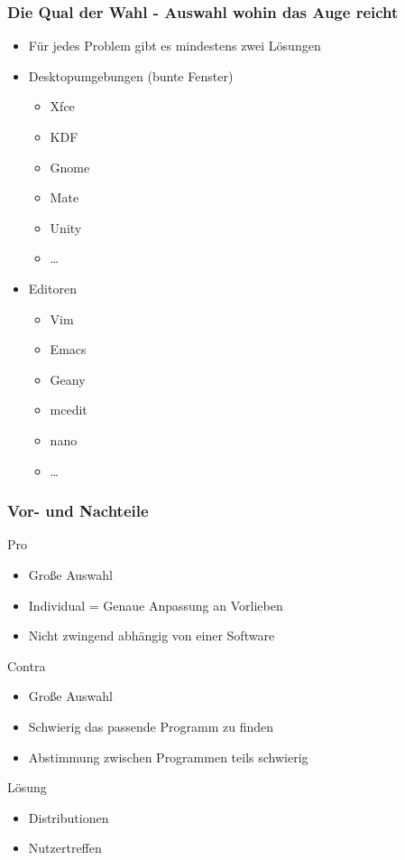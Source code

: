 \documentclass[compress]{beamer}
\begin{document}
\begin{frame}
	\frametitle{Die Qual der Wahl - Auswahl wohin das Auge reicht}
	\begin{block}{}
		\begin{itemize}
			\item Für jedes Problem gibt es mindestens zwei Lösungen
			\pause{}
			\item Desktopumgebungen (bunte Fenster)
				\begin{itemize}
					\item Xfce
					\item KDF
					\item Gnome
					\item Mate
					\item Unity
					\item \dots{}
				\end{itemize}
			\pause
			\item Editoren
				\begin{itemize}
					\item Vim
					\item Emacs
					\item Geany
					\item mcedit
					\item nano
					\item \dots{}
				\end{itemize}
		\end{itemize}
	\end{block}
\end{frame}

\begin{frame}
	\frametitle{Vor- und Nachteile}
	\begin{block}{Pro}
		\begin{itemize}
			\item Große Auswahl
			\item Individual = Genaue Anpassung an Vorlieben
			\item Nicht zwingend abhängig von einer Software
		\end{itemize}
	\end{block}
	\pause{}
	\begin{block}{Contra}
		\begin{itemize}
			\item Große Auswahl
			\item Schwierig das passende Programm zu finden
			\item Abstimmung zwischen Programmen teils schwierig
		\end{itemize}
	\end{block}
	\pause{}
	\begin{block}{Lösung}
		\begin{itemize}
			\item Distributionen
			\item Nutzertreffen
		\end{itemize}
	\end{block}
\end{frame}
\end{document}
